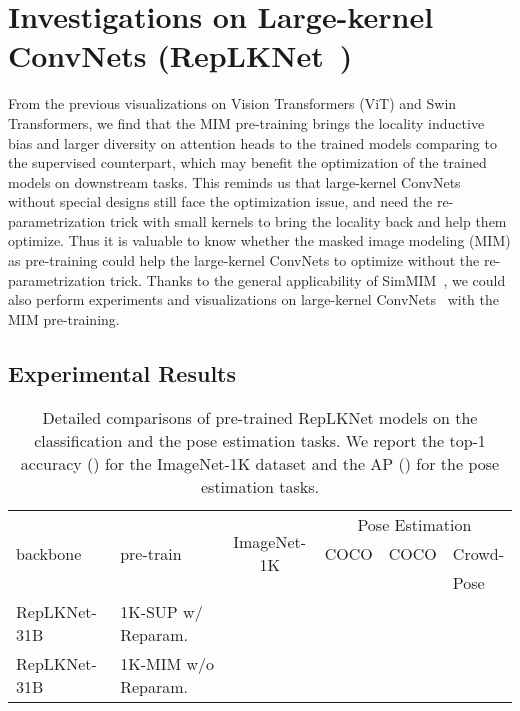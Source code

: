 \documentclass{article}
\begin{document}
\section{Investigations on Large-kernel ConvNets (RepLKNet~\cite{replknet})}\label{sec:lknet}

From the previous visualizations on Vision Transformers (ViT) and Swin Transformers, we find that the MIM pre-training brings the locality inductive bias and larger diversity on attention heads to the trained models comparing to the supervised counterpart, which may benefit the optimization of the trained models on downstream tasks.  This reminds us that large-kernel ConvNets~\cite{replknet} without special designs still face the optimization issue, and need the re-parametrization trick with small kernels to bring the locality back and help them optimize. Thus it is valuable to know whether the masked image modeling (MIM) as pre-training could help the large-kernel ConvNets to optimize without the re-parametrization trick.
Thanks to the general applicability of SimMIM~\cite{xie2021simmim}, we could also perform experiments and visualizations on large-kernel ConvNets~\cite{replknet} with the MIM pre-training.


\subsection{Experimental Results}

\renewcommand{\arraystretch}{1.12}
\begin{table}[h]
  \centering
  \addtolength{\tabcolsep}{-1.5pt}
  \begin{tabular}{m{3.02cm}<{\centering}m{3.5cm}<{\centering}|c|m{1.19cm}<{\centering}m{1.19cm}<{\centering}m{1.19cm}<{\centering}}
    \bottomrule
    \multirow{3}{*}{backbone}  & \multirow{3}{*}{pre-train}  &  \multirow{3}{*}{ImageNet-1K} &  \multicolumn{3}{c}{Pose Estimation} \\
    & & & COCO & COCO & Crowd-  \\
    & & &   &  & Pose\\
    \hline
    RepLKNet-31B & 1K-SUP w/ Reparam. &  &  &  & \\
    RepLKNet-31B & 1K-MIM w/o Reparam. &  &  &  & \\
    \toprule
  \end{tabular}
  \caption{Detailed comparisons of pre-trained RepLKNet models on the classification and the pose estimation tasks. We report the top-1 accuracy () for the ImageNet-1K dataset and the AP () for the pose estimation tasks.
  }
  \label{tab-lknet}
  \vspace{-1.0em}
\end{table}
\end{document}
